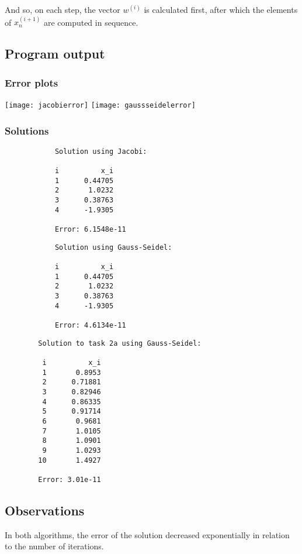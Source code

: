 \documentclass{article}
\begin{document}
	And so, on each step, the vector $w^{(i)}$ is calculated first, after which
	the elements of $x_n^{(i + 1)}$ are computed in sequence.
	
	\subsection{Program output}
	
	\subsubsection{Error plots}
	
	\texttt{[image: jacobierror]}
	\texttt{[image: gaussseidelerror]}
	
	\subsubsection{Solutions}
	
	\begin{multicols}{2}
		\begin{verbatim}
			Solution using Jacobi:

			i          x_i
			1      0.44705
			2       1.0232
			3      0.38763
			4      -1.9305

			Error: 6.1548e-11
		\end{verbatim}
		\begin{verbatim}
			Solution using Gauss-Seidel:

			i          x_i
			1      0.44705
			2       1.0232
			3      0.38763
			4      -1.9305

			Error: 4.6134e-11
		\end{verbatim}
	\end{multicols}
	
	\begin{verbatim}
		Solution to task 2a using Gauss-Seidel:
		
		 i          x_i
		 1       0.8953
		 2      0.71881
		 3      0.82946
		 4      0.86335
		 5      0.91714
		 6       0.9681
		 7       1.0105
		 8       1.0901
		 9       1.0293
		10       1.4927

		Error: 3.01e-11
	\end{verbatim}
	
	\subsection{Observations}
	
	In both algorithms, the error of the solution decreased exponentially in
	relation to the number of iterations.
	
\end{document}
